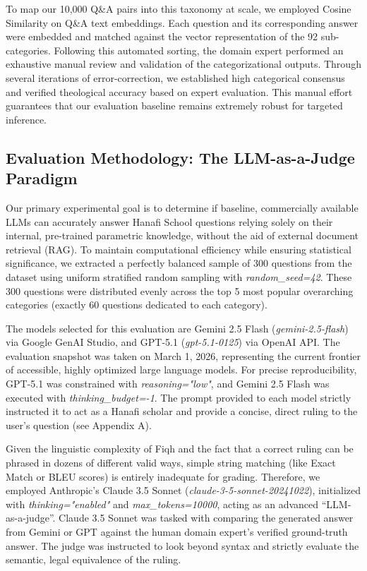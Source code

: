 To map our 10,000 Q\&A pairs into this taxonomy at scale, we employed Cosine Similarity on Q\&A text embeddings. Each question and its corresponding answer were embedded and matched against the vector representation of the 92 sub-categories. Following this automated sorting, the domain expert performed an exhaustive manual review and validation of the categorizational outputs. Through several iterations of error-correction, we established high categorical consensus and verified theological accuracy based on expert evaluation. This manual effort guarantees that our evaluation baseline remains extremely robust for targeted inference.

\subsection{Evaluation Methodology: The LLM-as-a-Judge Paradigm}
Our primary experimental goal is to determine if baseline, commercially available LLMs can accurately answer Hanafi School questions relying solely on their internal, pre-trained parametric knowledge, without the aid of external document retrieval (RAG). To maintain computational efficiency while ensuring statistical significance, we extracted a perfectly balanced sample of 300 questions from the dataset using uniform stratified random sampling with \textit{random\_seed=42}. These 300 questions were distributed evenly across the top 5 most popular overarching categories (exactly 60 questions dedicated to each category).

The models selected for this evaluation are Gemini 2.5 Flash (\textit{gemini-2.5-flash}) via Google GenAI Studio, and GPT-5.1 (\textit{gpt-5.1-0125}) via OpenAI API. The evaluation snapshot was taken on March 1, 2026, representing the current frontier of accessible, highly optimized large language models. For precise reproducibility, GPT-5.1 was constrained with \textit{reasoning="low"}, and Gemini 2.5 Flash was executed with \textit{thinking\_budget=-1}. The prompt provided to each model strictly instructed it to act as a Hanafi scholar and provide a concise, direct ruling to the user's question (see Appendix A).

Given the linguistic complexity of Fiqh and the fact that a correct ruling can be phrased in dozens of different valid ways, simple string matching (like Exact Match or BLEU scores) is entirely inadequate for grading. Therefore, we employed Anthropic's Claude 3.5 Sonnet (\textit{claude-3-5-sonnet-20241022}), initialized with \textit{thinking="enabled"} and \textit{max\_tokens=10000}, acting as an advanced ``LLM-as-a-judge''. Claude 3.5 Sonnet was tasked with comparing the generated answer from Gemini or GPT against the human domain expert's verified ground-truth answer. The judge was instructed to look beyond syntax and strictly evaluate the semantic, legal equivalence of the ruling.

